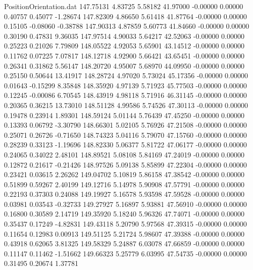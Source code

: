 \begin{filecontents}{PositionOrientation.dat}
 147.75131    4.83725    5.58182    41.97000   -0.00000    0.00000    0.40757    0.45077   -1.28674
 147.82309    4.86650    5.61418    41.87764   -0.00000    0.00000    0.15105   -0.08060   -0.38788
 147.90313    4.87859    5.60773    41.84660   -0.00000    0.00000    0.30190    0.47831    9.36035
 147.97514    4.90033    5.64217    42.52063   -0.00000    0.00000    0.25223    0.21026    7.79809
 148.05522    4.92053    5.65901    43.14512   -0.00000    0.00000    0.11762    0.07225    7.07817
 148.12718    4.92900    5.66421    43.65451   -0.00000    0.00000    0.26341    0.31862    5.56147
 148.20720    4.95007    5.68970    44.09950   -0.00000    0.00000    0.25150    0.50644   13.41917
 148.28724    4.97020    5.73024    45.17356   -0.00000    0.00000    0.01643   -0.15299    8.35848
 148.35920    4.97139    5.71923    45.77503   -0.00000    0.00000    0.12245   -0.00086    6.70545
 148.43919    4.98118    5.71916    46.31145   -0.00000    0.00000    0.20365    0.36215   13.73010
 148.51128    4.99586    5.74526    47.30113   -0.00000    0.00000    0.19478    0.23914    1.89301
 148.59124    5.01144    5.76439    47.45250   -0.00000    0.00000    0.13393    0.06792   -3.30790
 148.66301    5.02105    5.76926    47.21508   -0.00000    0.00000    0.25071    0.26726   -0.71650
 148.74323    5.04116    5.79070    47.15760   -0.00000    0.00000    0.28239    0.33123   -1.19696
 148.82330    5.06377    5.81722    47.06177   -0.00000    0.00000    0.24065    0.34022    2.48101
 148.89521    5.08108    5.84169    47.24019   -0.00000    0.00000    0.12872    0.21617   -0.21426
 148.97526    5.09138    5.85899    47.22304   -0.00000    0.00000    0.23421    0.03615    2.26262
 149.04702    5.10819    5.86158    47.38542   -0.00000    0.00000    0.51899    0.59267    2.40199
 149.12716    5.14978    5.90908    47.57791   -0.00000    0.00000    0.22193    0.37303    0.24088
 149.19927    5.16578    5.93598    47.59528   -0.00000    0.00000    0.03981    0.03543   -0.32733
 149.27927    5.16897    5.93881    47.56910   -0.00000    0.00000    0.16800    0.30589    2.14719
 149.35920    5.18240    5.96326    47.74071   -0.00000    0.00000    0.35437    0.17249   -4.82831
 149.43118    5.20790    5.97568    47.39315   -0.00000    0.00000    0.11654    0.12983    0.00913
 149.51125    5.21724    5.98607    47.39388   -0.00000    0.00000    0.43918    0.62065    3.81325
 149.58329    5.24887    6.03078    47.66859   -0.00000    0.00000    0.11147    0.11462   -1.51662
 149.66323    5.25779    6.03995    47.54735   -0.00000    0.00000    0.31495    0.20674    1.37781

\end{filecontents}
